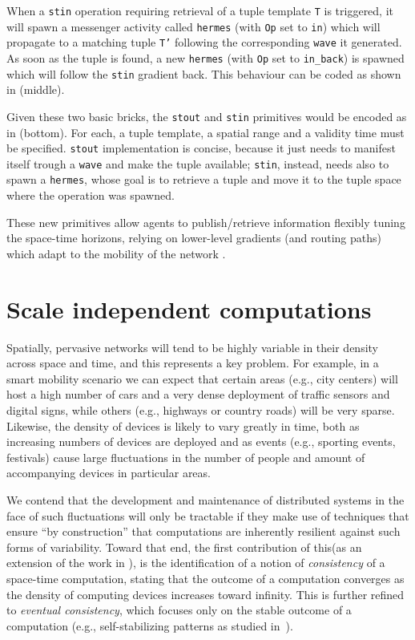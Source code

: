 \documentclass[12pt,a4paper,twoside,openright]{book}
\begin{document}
When a \texttt{stin} operation requiring retrieval of a tuple template \texttt{T} is triggered, it will spawn a messenger activity called \texttt{hermes} (with \texttt{Op} set to \texttt{in}) which will propagate to a matching tuple \texttt{T'} following the corresponding \texttt{wave} it generated. As soon as the tuple is found, a new \texttt{hermes} (with \texttt{Op} set to \texttt{in\_back}) is spawned which will follow the \texttt{stin} gradient back. This behaviour can be coded as shown in  (middle). 

Given these two basic bricks, the \texttt{stout} and \texttt{stin} primitives would be encoded as in  (bottom). For each, a tuple template, a spatial range and a validity time must be specified. \texttt{stout} implementation is concise, because it just needs to manifest itself trough a \texttt{wave} and make the tuple available; \texttt{stin}, instead, needs also to spawn a \texttt{hermes}, whose goal is to retrieve a tuple and move it to the tuple space where the operation was spawned.

These new primitives allow agents to publish/retrieve information flexibly tuning the space-time horizons, relying on lower-level gradients (and routing paths) which adapt to the mobility of the network \cite{flexiblegradients}.

\chapter{Scale independent computations}

Spatially, pervasive networks will tend to be highly variable in their density across space and time, and this represents a key problem.
%
For example, in a smart mobility scenario we can expect that certain areas (e.g., city centers) will host a high number of cars and a very dense deployment of traffic sensors and digital signs, while others (e.g., highways or country roads) will be very sparse.
%
Likewise, the density of devices is likely to vary greatly in time, both as increasing numbers of devices are deployed and as events (e.g., sporting events, festivals) cause large fluctuations in the number of people and amount of accompanying devices in particular areas.

We contend that the development and maintenance of distributed systems in the face of such fluctuations will only be tractable if they make use of techniques that ensure ``by construction'' that computations are inherently resilient against such forms of variability.
%
Toward that end, the first contribution of this\levelText{}(as an extension of the work in \cite{BVD-SCW14}), is the identification of a notion of \emph{consistency} of a space-time computation, stating that the outcome of a computation converges as the density of computing devices increases toward infinity.
%
This is further refined to \emph{eventual consistency}, which focuses only on the stable outcome of a computation (e.g., self-stabilizing patterns as studied in~\cite{VD-COORD2014-LNCS2014}).
\end{document}
